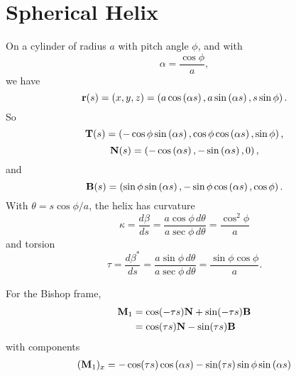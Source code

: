 \documentclass{ximera}
\begin{document}
\section*{Spherical Helix}
On a cylinder of radius $a$ with pitch angle $\phi$, and with 
\[
    \alpha = \frac{\cos\phi}{a},
\]
we have
\[
   {\bf r}(s) =  (x,y,z) = \left( a \cos \left( \alpha s \right) , a \sin \left( \alpha s \right), s \sin \phi  \right) .
\]
So
\[
     {\bf T}(s) = \left( - \cos\phi \sin \left( \alpha s \right)  ,\cos\phi   \cos \left( \alpha s \right)  , \sin \phi         \right) ,
\]
\[
         {\bf N}(s) = \left(  - \cos \left( \alpha s \right)  ,   -\sin \left( \alpha s \right) , 0    \right) ,
\]
and
\[
     {\bf B}(s) = \left(   \sin\phi  \sin \left( \alpha s \right) ,   -\sin\phi    \cos \left(\alpha s\right) , \cos\phi \right) .
\]
With $\theta = s\cos\phi/a$, the helix has curvature
\[
    \kappa = \frac{d\beta}{ds} = \frac{a\cos\phi \, d\theta}{a\sec\phi \, d\theta} = \frac{\cos^2\phi}{a}
\]
and torsion
\[
     \tau = \frac{d\beta^*}{ds} = \frac{a\sin\phi \, d\theta}{a\sec\phi \, d\theta} = \frac{\sin\phi\cos\phi}{a}.
\]

For the Bishop frame,
\begin{align*}
{\bf M}_1 &= \cos(-\tau s) {\bf N} + \sin(-\tau s) {\bf B}     \\
               &= \cos(\tau s) {\bf N} - \sin(\tau s) {\bf B} \\
\end{align*}
with components
\begin{align*}
     ( {\bf M}_1)_x &= - \cos(\tau s)\cos \left( \alpha s \right) - \sin(\tau s)   \sin\phi  \sin \left( \alpha s \right) \\
\end{align*}
\end{document}
